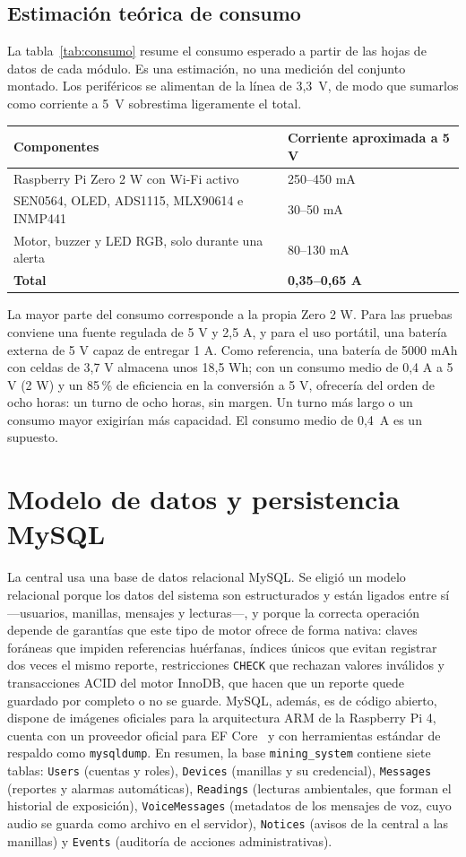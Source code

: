\documentclass[10pt,a4paper]{article}
\newcommand{\code}[1]{{\small\urlstyle{tt}\nolinkurl{#1}}}
\newcommand{\newsection}[1]{\clearpage\section{#1}}
\begin{document}
\subsection{Estimación teórica de consumo}
\label{sec:consumo}
La tabla~\ref{tab:consumo} resume el consumo esperado a partir de las hojas de datos de cada módulo. Es una estimación, no una medición del conjunto montado. Los periféricos se alimentan de la línea de 3,3~V, de modo que sumarlos como corriente a 5~V sobrestima ligeramente el total.

\label{tab:consumo}
\begin{tabularx}{\linewidth}{@{}Y P{45mm}@{}}
\toprule\textbf{Componentes} & \textbf{Corriente aproximada a 5 V}\\\midrule
Raspberry Pi Zero 2 W con Wi-Fi activo & 250--450 mA\\
SEN0564, OLED, ADS1115, MLX90614 e INMP441 & 30--50 mA\\
Motor, buzzer y LED RGB, solo durante una alerta & 80--130 mA\\\midrule
\textbf{Total} & \textbf{0,35--0,65 A}\\\bottomrule
\end{tabularx}

La mayor parte del consumo corresponde a la propia Zero 2 W. Para las pruebas conviene una fuente regulada de 5 V y 2,5 A, y para el uso portátil, una batería externa de 5 V capaz de entregar 1 A. Como referencia, una batería de 5000 mAh con celdas de 3,7 V almacena unos 18,5 Wh; con un consumo medio de 0,4 A a 5 V (2 W) y un 85\,\% de eficiencia en la conversión a 5 V, ofrecería del orden de ocho horas: un turno de ocho horas, sin margen. Un turno más largo o un consumo mayor exigirían más capacidad. El consumo medio de 0,4~A es un supuesto.

\newsection{Modelo de datos y persistencia MySQL}
\label{sec:datos}
La central usa una base de datos relacional MySQL. Se eligió un modelo relacional porque los datos del sistema son estructurados y están ligados entre sí —usuarios, manillas, mensajes y lecturas—, y porque la correcta operación depende de garantías que este tipo de motor ofrece de forma nativa: claves foráneas que impiden referencias huérfanas, índices únicos que evitan registrar dos veces el mismo reporte, restricciones \code{CHECK} que rechazan valores inválidos y transacciones ACID del motor InnoDB, que hacen que un reporte quede guardado por completo o no se guarde. MySQL, además, es de código abierto, dispone de imágenes oficiales para la arquitectura ARM de la Raspberry Pi 4, cuenta con un proveedor oficial para EF Core~\cite{mysql,provider} y con herramientas estándar de respaldo como \code{mysqldump}. En resumen, la base \code{mining_system} contiene siete tablas: \code{Users} (cuentas y roles), \code{Devices} (manillas y su credencial), \code{Messages} (reportes y alarmas automáticas), \code{Readings} (lecturas ambientales, que forman el historial de exposición), \code{VoiceMessages} (metadatos de los mensajes de voz, cuyo audio se guarda como archivo en el servidor), \code{Notices} (avisos de la central a las manillas) y \code{Events} (auditoría de acciones administrativas).
\end{document}

